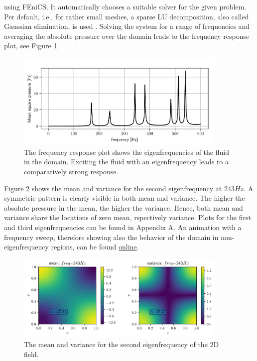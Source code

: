 \documentclass[%
  a4paper,oneside,%
  11pt,%
  smallchapters,
  style=printdev,
  extramargin,
  green,%
  rgb, <cmyk>
  ]{tubsbook}
\begin{document}
using FEniCS. It automatically chooses a suitable solver for the given problem. Per default, i.e., for rather small meshes, a sparse LU decomposition, also called Gaussian elimination, is used \cite{langtangen2016}.
\FloatBarrier
Solving the system for a range of frequencies and averaging the absolute pressure over the domain leads to the frequency response plot, see Figure \ref{fig:frf}.
\begin{figure}[!ht]
\begin{center}
\includegraphics[width=0.9\textwidth]{pics/frf}
\caption[Frequency Response Function for the 2D Helmholtz equation example]{The frequency response plot shows the eigenfrequencies of the fluid in the domain. Exciting the fluid with an eigenfrequency leads to a comparatively strong response.}
\label{fig:frf}
\end{center}
\end{figure}
%
Figure \ref{fig:Eigen243} shows the mean and variance for the second eigenfrequency at $243Hz$. A symmetric pattern is clearly visible in both mean and variance. The higher the absolute pressure in the mean, the higher the variance. Hence, both mean and variance share the locations of zero mean, rspectively variance. Plots for the first and third eigenfrequencies can be found in Appendix A. An animation with a frequency sweep, therefore showing also the behavior of the domain in non-eigenfrequency regions, can be found \href{https://github.com/herluc/Masterarbeit/blob/master/MA_LucasHermann/Python/Results/2D/FreqVar.gif}{online}.
\begin{figure}[!ht]
\begin{center}
\includegraphics[width=0.9\textwidth]{pics/Freq243}
\caption[The mode shape of the second eigenfrequency of the 2D Helmholtz equation example]{The mean and variance for the second eigenfrequency of the 2D field.}
\label{fig:Eigen243}
\end{center}
\end{figure}
\end{document}
